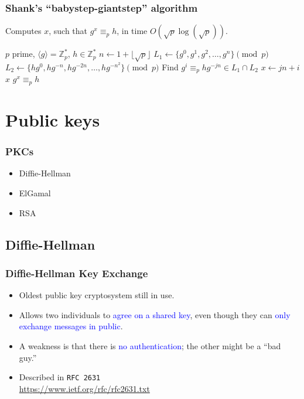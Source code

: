 \begin{frame}
\frametitle{Shank's ``babystep-giantstep'' algorithm}

Computes $x$, such that $g^x\equiv_p h$,
in time $O(\sqrt{p}\log(\sqrt{p}))$.

\begin{algorithmic}[1] 
\REQUIRE $p$ prime, $\langle g\rangle=\mathbb{Z}_p^*$,
$h\in\mathbb{Z}_p^*$
   \STATE  $n\longleftarrow 1+\lfloor\sqrt{p}\rfloor$
   \STATE  $L_1\longleftarrow\{g^0,g^1,g^2,\ldots,g^n\}\pmod p$
   \STATE  $L_2\longleftarrow\{hg^0,hg^{-n},hg^{-2n},\ldots,hg^{-n^2}\}\pmod p$
   \STATE  Find $g^i\equiv_p hg^{-jn}\in L_1\cap L_2$
   \STATE  $x\longleftarrow jn+i$
   \RETURN $x$
\ENSURE $g^x\equiv_p h$
\end{algorithmic}
\end{frame}

\section{Public keys}

\begin{frame}
\frametitle{PKCs}

\begin{itemize}
\item Diffie-Hellman
\item ElGamal
\item RSA
\end{itemize}
\end{frame}

\subsection{Diffie-Hellman}

\begin{frame}
\frametitle{Diffie-Hellman Key Exchange}

\begin{itemize}
\item  Oldest public key cryptosystem still in use.
\item  Allows two individuals to \textcolor{blue}{agree on a shared
key}, even though they can \textcolor{blue}{only exchange messages in
public}.
\item  A weakness is that there is \textcolor{blue}{no
authentication}; the other might be a ``bad guy.''

\item  Described in {\tt RFC 2631} \\
\url{https://www.ietf.org/rfc/rfc2631.txt}
\end{itemize}
\end{frame}

